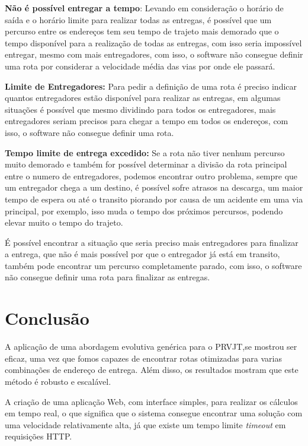 \textbf{Não é possível entregar a tempo}: Levando em consideração o horário de saída e o horário limite para realizar todas as entregas, é possível que um percurso entre os endereços tem seu tempo de trajeto mais demorado que o tempo disponível para a realização de todas as entregas, com isso seria impossível entregar, mesmo com mais entregadores, com isso, o software não consegue definir uma rota por considerar a velocidade média das vias por onde ele passará.

\textbf{Limite de Entregadores:} Para pedir a definição de uma rota é preciso indicar quantos entregadores estão disponível para realizar as entregas, em algumas situações é possível que mesmo dividindo para todos os entregadores, mais entregadores seriam precisos para chegar a tempo em todos os endereços, com isso, o software não consegue definir uma rota.

\textbf{Tempo limite de entrega excedido:} Se a rota não tiver nenhum percurso muito demorado e também for possível determinar a divisão da rota principal entre o numero de entregadores, podemos encontrar outro problema, sempre que um entregador chega a um destino, é possível sofre atrasos na descarga, um maior tempo de espera ou até o transito piorando por causa de um acidente em uma via principal, por exemplo, isso muda o tempo dos próximos percursos, podendo elevar muito o tempo do trajeto.

É possível encontrar a situação que seria preciso mais entregadores para finalizar a entrega, que não é mais possível por que o entregador já está em transito, também pode encontrar um percurso completamente parado,  com isso, o software não consegue definir uma rota para finalizar as entregas.

\chapter{Conclusão}

A aplicação de uma abordagem evolutiva genérica para o PRVJT,se mostrou ser eficaz, uma vez que fomos capazes de encontrar rotas otimizadas para varias combinações de endereço de entrega. Além disso, os resultados mostram que este método é robusto e escalável. 

A criação de uma aplicação Web, com interface simples, para realizar os cálculos em tempo real, o que significa que o sistema consegue encontrar uma solução com uma velocidade relativamente alta, já que existe um tempo limite \textit{timeout} em requisições HTTP.

